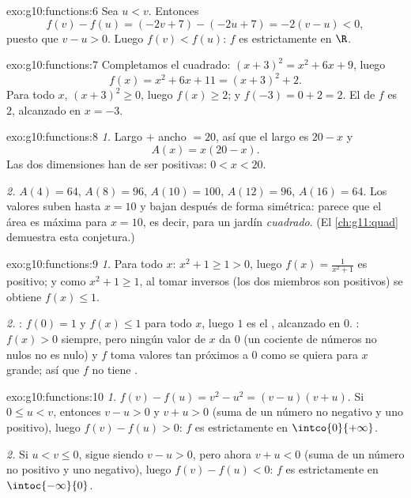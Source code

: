 \begin{solution}{exo:g10:functions:6}
Sea $u < v$. Entonces
\[
f(v) - f(u) = (-2v + 7) - (-2u + 7) = -2(v - u) < 0,
\]
puesto que $v - u > 0$. Luego $f(v) < f(u)$: $f$ es estrictamente
 en $\R$.
\end{solution}

\begin{solution}{exo:g10:functions:7}
Completamos el cuadrado: $(x+3)^2 = x^2 + 6x + 9$, luego
\[
f(x) = x^2 + 6x + 11 = (x + 3)^2 + 2 .
\]
Para todo $x$, $(x+3)^2 \geq 0$, luego $f(x) \geq 2$; y
$f(-3) = 0 + 2 = 2$. El  de $f$ es $2$, alcanzado en $x = -3$.
\end{solution}

\begin{solution}{exo:g10:functions:8}
\emph{1.} Largo $+$ ancho $= 20$, así que el largo es $20 - x$ y
\[
A(x) = x(20 - x).
\]
Las dos dimensiones han de ser positivas: $0 < x < 20$.

\emph{2.} $A(4) = 64$, $A(8) = 96$, $A(10) = 100$, $A(12) = 96$,
$A(16) = 64$. Los valores suben hasta $x = 10$ y bajan después de forma
simétrica: parece que el área es máxima para $x = 10$, es decir, para un
jardín \emph{cuadrado}. (El \cref{ch:g11:quad} demuestra esta conjetura.)
\end{solution}

\begin{solution}{exo:g10:functions:9}
\emph{1.} Para todo $x$: $x^2 + 1 \geq 1 > 0$, luego
$f(x) = \frac{1}{x^2+1}$ es positivo; y como $x^2 + 1 \geq 1$, al tomar
inversos (los dos miembros son positivos) se obtiene $f(x) \leq 1$.

\emph{2.} : $f(0) = 1$ y $f(x) \leq 1$ para todo $x$, luego $1$ es
el , alcanzado en $0$. : $f(x) > 0$ siempre, pero ningún valor
de $x$ da $0$ (un cociente de números no nulos no es nulo) y $f$ toma
valores tan próximos a $0$ como se quiera para $x$ grande; así que $f$ no
tiene .
\end{solution}

\begin{solution}{exo:g10:functions:10}
\emph{1.} $f(v) - f(u) = v^2 - u^2 = (v-u)(v+u)$. Si $0 \leq u < v$,
entonces $v - u > 0$ y $v + u > 0$ (suma de un número no negativo y uno
positivo), luego $f(v) - f(u) > 0$: $f$ es estrictamente  en
$\intco{0}{+\infty}$.

\emph{2.} Si $u < v \leq 0$, sigue siendo $v - u > 0$, pero ahora
$v + u < 0$ (suma de un número no positivo y uno negativo), luego
$f(v) - f(u) < 0$: $f$ es estrictamente  en
$\intoc{-\infty}{0}$.
\end{solution}

